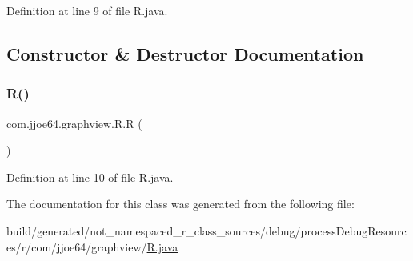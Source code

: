 Definition at line 9 of file R.\+java.



\subsection{Constructor \& Destructor Documentation}
\mbox{\label{classcom_1_1jjoe64_1_1graphview_1_1_r_a7be993fb9c843ee7caa4549a95ce8d12}} 
\subsubsection{\texorpdfstring{R()}{R()}}
{\footnotesize\ttfamily com.\+jjoe64.\+graphview.\+R.\+R (\begin{DoxyParamCaption}{ }\end{DoxyParamCaption})\hspace{0.3cm}{\ttfamily [private]}}



Definition at line 10 of file R.\+java.


\begin{DoxyCode}{0}

\end{DoxyCode}


The documentation for this class was generated from the following file\+:\begin{DoxyCompactItemize}
\item 
build/generated/not\+\_\+namespaced\+\_\+r\+\_\+class\+\_\+sources/debug/process\+Debug\+Resources/r/com/jjoe64/graphview/\mbox{\hyperlink{com_2jjoe64_2graphview_2_r_8java}{R.\+java}}\end{DoxyCompactItemize}
